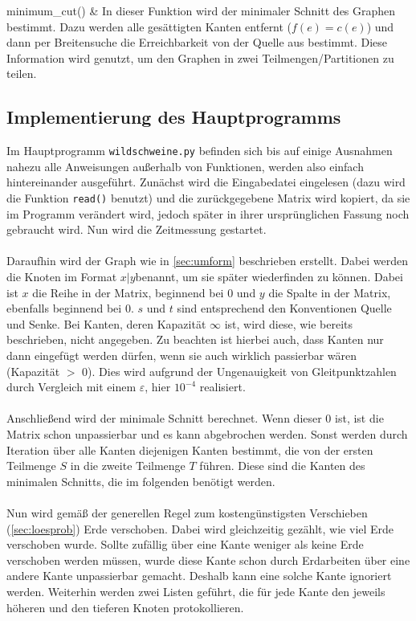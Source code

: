 \documentclass[a4paper, notitlepage, 12pt]{scrartcl}
\begin{document}
\begin{longtabu}
 minimum\_cut() & In dieser Funktion wird der minimaler Schnitt des Graphen bestimmt. Dazu werden alle gesättigten Kanten entfernt ($f(e) = c(e)$) und dann per Breitensuche die Erreichbarkeit von der Quelle aus bestimmt. Diese Information wird genutzt, um den Graphen in zwei Teilmengen/Partitionen zu teilen. \\
 \end{longtabu}
 \subsection{Implementierung des Hauptprogramms}
Im Hauptprogramm \texttt{wildschweine.py} befinden sich bis auf einige Ausnahmen nahezu alle Anweisungen außerhalb von Funktionen, werden also einfach hintereinander ausgeführt. Zunächst wird die Eingabedatei eingelesen (dazu wird die Funktion \texttt{read()} benutzt) und die zurückgegebene Matrix wird kopiert, da sie im Programm verändert wird, jedoch später in ihrer ursprünglichen Fassung noch gebraucht wird. Nun wird die Zeitmessung gestartet. \\ \\
Daraufhin wird der Graph wie in \autoref{sec:umform} beschrieben erstellt. Dabei werden die Knoten im Format \glqq $x|y$\grqq benannt, um sie später wiederfinden zu können. Dabei ist $x$ die Reihe in der Matrix, beginnend bei 0 und $y$ die Spalte in der Matrix, ebenfalls beginnend bei 0. $s$ und $t$ sind entsprechend den Konventionen Quelle und Senke. Bei Kanten, deren Kapazität $\infty$ ist, wird diese, wie bereits beschrieben, nicht angegeben. Zu beachten ist hierbei auch, dass Kanten nur dann eingefügt werden dürfen, wenn sie auch wirklich passierbar wären (Kapazität $>$ 0). Dies wird aufgrund der Ungenauigkeit von Gleitpunktzahlen durch Vergleich mit einem $\varepsilon$, hier $10^{-4}$ realisiert. \\ \\
Anschließend wird der minimale Schnitt berechnet. Wenn dieser 0 ist, ist die Matrix schon unpassierbar und es kann abgebrochen werden. Sonst werden durch Iteration über alle Kanten diejenigen Kanten bestimmt, die von der ersten Teilmenge $S$ in die zweite Teilmenge $T$ führen. Diese sind die Kanten des minimalen Schnitts, die im folgenden benötigt werden. \\ \\
Nun wird gemäß der generellen Regel zum kostengünstigsten Verschieben (\autoref{sec:loesprob}) Erde verschoben. Dabei wird gleichzeitig gezählt, wie viel Erde verschoben wurde. Sollte zufällig über eine Kante weniger als keine Erde verschoben werden müssen, wurde diese Kante schon durch Erdarbeiten über eine andere Kante unpassierbar gemacht. Deshalb kann eine solche Kante ignoriert werden. Weiterhin werden zwei Listen geführt, die für jede Kante den jeweils höheren und den tieferen Knoten protokollieren. \\ \\
\end{document}
